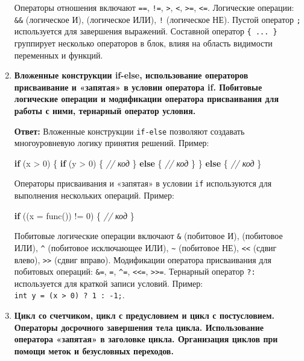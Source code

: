 \documentclass[
]{article}
\newenvironment{Shaded}{}{}
\newcommand{\CommentTok}[1]{\textcolor[rgb]{0.38,0.63,0.69}{\textit{#1}}}
\newcommand{\ControlFlowTok}[1]{\textcolor[rgb]{0.00,0.44,0.13}{\textbf{#1}}}
\newcommand{\DecValTok}[1]{\textcolor[rgb]{0.25,0.63,0.44}{#1}}
\newcommand{\NormalTok}[1]{#1}
\newcommand{\OperatorTok}[1]{\textcolor[rgb]{0.40,0.40,0.40}{#1}}
\begin{document}
\begin{enumerate}
  Операторы отношения включают \texttt{==}, \texttt{!=},
  \texttt{\textgreater{}}, \texttt{\textless{}},
  \texttt{\textgreater{}=}, \texttt{\textless{}=}. Логические операции:
  \texttt{\&\&} (логическое И), \texttt{\textbar{}\textbar{}}
  (логическое ИЛИ), \texttt{!} (логическое НЕ). Пустой оператор
  \texttt{;} используется для завершения выражений. Составной оператор
  \texttt{\{\ ...\ \}} группирует несколько операторов в блок, влияя на
  область видимости переменных и функций.
\item
  \textbf{Вложенные конструкции if-else, использование операторов
  присваивание и «запятая» в условии оператора if. Побитовые логические
  операции и модификации оператора присваивания для работы с ними,
  тернарный оператор условия.}

  \textbf{Ответ:} Вложенные конструкции \texttt{if-else} позволяют
  создавать многоуровневую логику принятия решений. Пример:

\begin{Shaded}
\begin{Highlighting}[]
\ControlFlowTok{if} \OperatorTok{(}\NormalTok{x }\OperatorTok{\textgreater{}} \DecValTok{0}\OperatorTok{)} \OperatorTok{\{}
    \ControlFlowTok{if} \OperatorTok{(}\NormalTok{y }\OperatorTok{\textgreater{}} \DecValTok{0}\OperatorTok{)} \OperatorTok{\{}
        \CommentTok{// код}
    \OperatorTok{\}} \ControlFlowTok{else} \OperatorTok{\{}
        \CommentTok{// код}
    \OperatorTok{\}}
\OperatorTok{\}} \ControlFlowTok{else} \OperatorTok{\{}
    \CommentTok{// код}
\OperatorTok{\}}
\end{Highlighting}
\end{Shaded}

  Операторы присваивания и «запятая» в условии \texttt{if} используются
  для выполнения нескольких операций. Пример:

\begin{Shaded}
\begin{Highlighting}[]
\ControlFlowTok{if} \OperatorTok{((}\NormalTok{x }\OperatorTok{=}\NormalTok{ func}\OperatorTok{())} \OperatorTok{!=} \DecValTok{0}\OperatorTok{)} \OperatorTok{\{}
    \CommentTok{// код}
\OperatorTok{\}}
\end{Highlighting}
\end{Shaded}

  Побитовые логические операции включают \texttt{\&} (побитовое И),
  \texttt{\textbar{}} (побитовое ИЛИ), \texttt{\^{}} (побитовое
  исключающее ИЛИ), \texttt{\textasciitilde{}} (побитовое НЕ),
  \texttt{\textless{}\textless{}} (сдвиг влево),
  \texttt{\textgreater{}\textgreater{}} (сдвиг вправо). Модификации
  оператора присваивания для побитовых операций: \texttt{\&=},
  \texttt{\textbar{}=}, \texttt{\^{}=},
  \texttt{\textless{}\textless{}=},
  \texttt{\textgreater{}\textgreater{}=}. Тернарный оператор \texttt{?:}
  используется для краткой записи условий. Пример:
  \texttt{int\ y\ =\ (x\ \textgreater{}\ 0)\ ?\ 1\ :\ -1;}.
\item
  \textbf{Цикл со счетчиком, цикл с предусловием и цикл с постусловием.
  Операторы досрочного завершения тела цикла. Использование оператора
  «запятая» в заголовке цикла. Организация циклов при помощи меток и
  безусловных переходов.}


\end{enumerate}
\end{document}
